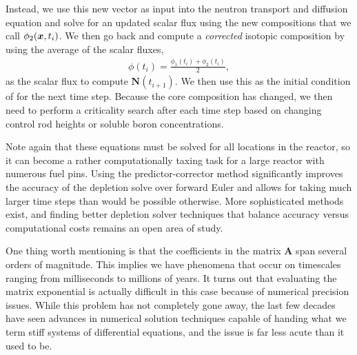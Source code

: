 Instead, we use this new vector as input into the neutron transport and diffusion equation and solve for an updated scalar flux using the new compositions that we call $\phi_2(\bm{x},t_i)$. We then go back and compute a \emph{corrected} isotopic composition by using the average of the scalar fluxes,
\begin{align}
  \phi(t_i) = \frac{ \phi_1(t_i) + \phi_2(t_i) }{ 2 } ,
\end{align}
as the scalar flux to compute $\mathbf{N}(t_{i+1})$. We then use this as the initial condition of for the next time step. Because the core composition has changed, we then need to perform a criticality search after each time step based on changing control rod heights or soluble boron concentrations.

Note again that these equations must be solved for all locations in the reactor, so it can become a rather computationally taxing task for a large reactor with numerous fuel pins. Using the predictor-corrector method significantly improves the accuracy of the depletion solve over forward Euler and allows for taking much larger time steps than would be possible otherwise. More sophisticated methods exist, and finding better depletion solver techniques that balance accuracy versus computational costs remains an open area of study.

One thing worth mentioning is that the coefficients in the matrix $\mathbf{A}$ span several orders of magnitude. This implies we have phenomena that occur on timescales ranging from milliseconds to millions of years. It turns out that evaluating the matrix exponential is actually difficult in this case because of numerical precision issues. While this problem has not completely gone away, the last few decades have seen advances in numerical solution techniques capable of handing what we term stiff systems of differential equations, and the issue is far less acute than it used to be.


